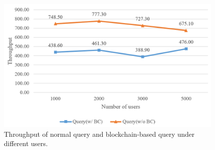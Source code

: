 \begin{figure}[htb]
    \centering
    \includegraphics[height=!,width=1\linewidth,keepaspectratio=true]{figures/query.png}
    \caption{{\footnotesize Throughput of normal query and blockchain-based query under different users.}}
    \label{fig:query}
\end{figure}